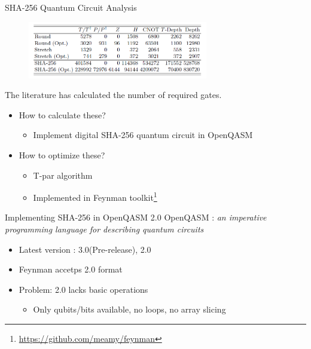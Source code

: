 \documentclass{beamer}
\begin{document}
    \begin{frame}{SHA-256 Quantum Circuit Analysis}
        \begin{figure}[h]
            \centering
            \includegraphics[width=0.7\textwidth]{./Images/quant-sha2-thesis-res.png}
        \end{figure}
        The literature has calculated the number of required gates.
        \begin{itemize}
            \item How to calculate these?
            \begin{itemize}
                \item Implement digital SHA-256 quantum circuit in OpenQASM\cite{cross2017open}
            \end{itemize}
            \item How to optimize these?
            \begin{itemize}
                \item T-par algorithm \cite{amy2014polynomial}
                \item Implemented in Feynman toolkit\footnote{\url{https://github.com/meamy/feynman}}
            \end{itemize}
        \end{itemize}
    \end{frame}
    
    \begin{frame}{Implementing SHA-256 in OpenQASM 2.0}
        OpenQASM : \textit{an imperative programming language for describing quantum circuits}
        \begin{itemize}
            \item Latest version : 3.0(Pre-release), 2.0
            \item Feynman accetps 2.0 format
            \item Problem: 2.0 lacks basic operations
            \begin{itemize}
                \item Only qubits/bits available, no loops, no array slicing
            \end{itemize}
        \end{itemize}
    \end{frame}
    
\end{document}
